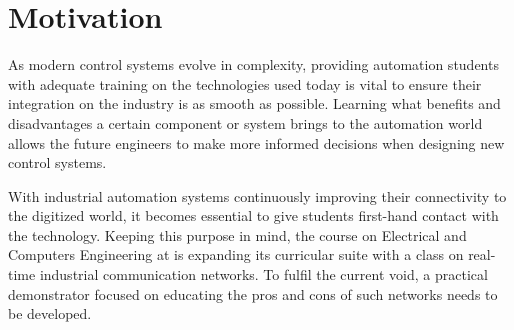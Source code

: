 \section{Motivation} \label{sec:motivation}

As modern control systems evolve in complexity, providing automation students with adequate training on the technologies used today is vital to ensure their integration on the industry is as smooth as possible. Learning what benefits and disadvantages a certain component or system brings to the automation world allows the future engineers to make more informed decisions when designing new control systems.

With industrial automation systems continuously improving their connectivity to the digitized world, it becomes essential to give students first-hand contact with the technology. Keeping this purpose in mind, the course on Electrical and Computers Engineering at \Feup{} is expanding its curricular suite with a class on real-time industrial communication networks. To fulfil the current void, a practical demonstrator focused on educating the pros and cons of such networks needs to be developed.
